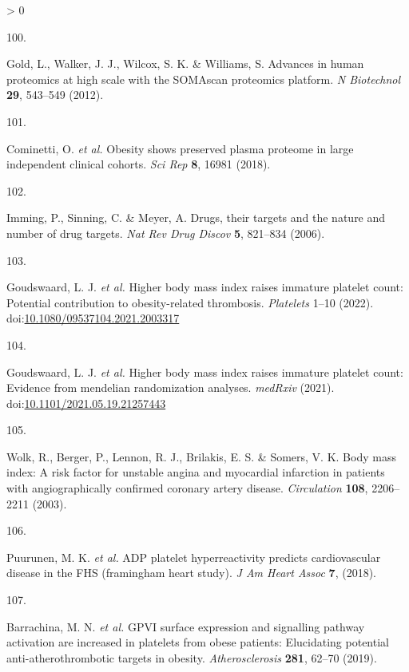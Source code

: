 \documentclass[11pt,twoside]{bristolthesis}
\newlength{\cslhangindent}
\newlength{\csllabelwidth}
\newenvironment{CSLReferences}[2] %
 {%
  \setlength{\parindent}{0pt}
  \ifodd #1 \everypar{\setlength{\hangindent}{\cslhangindent}}\ignorespaces\fi
  \ifnum #2 > 0
  \setlength{\parskip}{#2\baselineskip}
  \fi
 }%
 {}
\newcommand{\CSLLeftMargin}[1]{\parbox[t]{\csllabelwidth}{#1}}
\newcommand{\CSLRightInline}[1]{\parbox[t]{\linewidth - \csllabelwidth}{#1}\break}
\begin{document}
\begin{CSLReferences}{0}{0}
\leavevmode\hypertarget{ref-Gold2012}{}%
\CSLLeftMargin{100. }
\CSLRightInline{Gold, L., Walker, J. J., Wilcox, S. K. \& Williams, S. Advances in human proteomics at high scale with the SOMAscan proteomics platform. \emph{N Biotechnol} \textbf{29}, 543--549 (2012).}

\leavevmode\hypertarget{ref-Cominetti2018}{}%
\CSLLeftMargin{101. }
\CSLRightInline{Cominetti, O. \emph{et al.} Obesity shows preserved plasma proteome in large independent clinical cohorts. \emph{Sci Rep} \textbf{8}, 16981 (2018).}

\leavevmode\hypertarget{ref-Imming2006}{}%
\CSLLeftMargin{102. }
\CSLRightInline{Imming, P., Sinning, C. \& Meyer, A. Drugs, their targets and the nature and number of drug targets. \emph{Nat Rev Drug Discov} \textbf{5}, 821--834 (2006).}

\leavevmode\hypertarget{ref-Goudswaard2022}{}%
\CSLLeftMargin{103. }
\CSLRightInline{Goudswaard, L. J. \emph{et al.} Higher body mass index raises immature platelet count: Potential contribution to obesity-related thrombosis. \emph{Platelets} 1--10 (2022). doi:\href{https://doi.org/10.1080/09537104.2021.2003317}{10.1080/09537104.2021.2003317}}

\leavevmode\hypertarget{ref-Goudswaard2021a}{}%
\CSLLeftMargin{104. }
\CSLRightInline{Goudswaard, L. J. \emph{et al.} Higher body mass index raises immature platelet count: Evidence from mendelian randomization analyses. \emph{medRxiv} (2021). doi:\href{https://doi.org/10.1101/2021.05.19.21257443}{10.1101/2021.05.19.21257443}}

\leavevmode\hypertarget{ref-Wolk2003a}{}%
\CSLLeftMargin{105. }
\CSLRightInline{Wolk, R., Berger, P., Lennon, R. J., Brilakis, E. S. \& Somers, V. K. Body mass index: A risk factor for unstable angina and myocardial infarction in patients with angiographically confirmed coronary artery disease. \emph{Circulation} \textbf{108}, 2206--2211 (2003).}

\leavevmode\hypertarget{ref-Puurunen2018}{}%
\CSLLeftMargin{106. }
\CSLRightInline{Puurunen, M. K. \emph{et al.} ADP platelet hyperreactivity predicts cardiovascular disease in the FHS (framingham heart study). \emph{J Am Heart Assoc} \textbf{7}, (2018).}

\leavevmode\hypertarget{ref-Barrachina2019}{}%
\CSLLeftMargin{107. }
\CSLRightInline{Barrachina, M. N. \emph{et al.} GPVI surface expression and signalling pathway activation are increased in platelets from obese patients: Elucidating potential anti-atherothrombotic targets in obesity. \emph{Atherosclerosis} \textbf{281}, 62--70 (2019).}


\end{CSLReferences}
\end{document}
